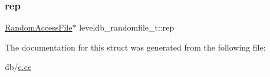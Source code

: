 \subsubsection{\texorpdfstring{rep}{rep}}
{\footnotesize\ttfamily \mbox{\hyperlink{classleveldb_1_1_random_access_file}{Random\+Access\+File}}$\ast$ leveldb\+\_\+randomfile\+\_\+t\+::rep}



The documentation for this struct was generated from the following file\+:\begin{DoxyCompactItemize}
\item 
db/\mbox{\hyperlink{c_8cc}{c.\+cc}}\end{DoxyCompactItemize}
